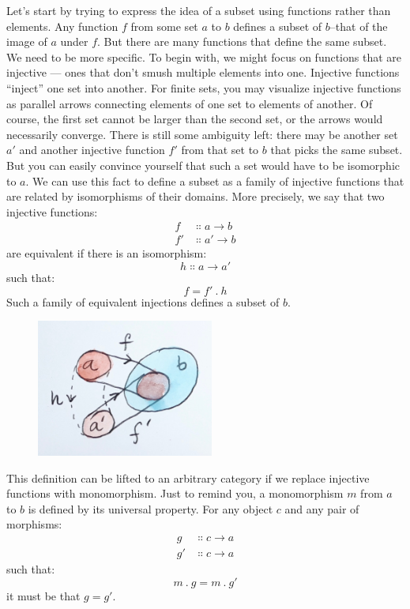 Let's start by trying to express the idea of a subset using functions
rather than elements. Any function $f$ from some set $a$
to $b$ defines a subset of $b$--that of the image of
$a$ under $f$. But there are many functions that define
the same subset. We need to be more specific. To begin with, we might
focus on functions that are injective --- ones that don't smush multiple
elements into one. Injective functions ``inject'' one set into another.
For finite sets, you may visualize injective functions as parallel
arrows connecting elements of one set to elements of another. Of course,
the first set cannot be larger than the second set, or the arrows would
necessarily converge. There is still some ambiguity left: there may be
another set $a'$ and another injective function
$f'$ from that set to $b$ that picks the same
subset. But you can easily convince yourself that such a set would have
to be isomorphic to $a$. We can use this fact to define a subset
as a family of injective functions that are related by isomorphisms of
their domains. More precisely, we say that two injective functions:
\begin{align*}
f &\Colon a \to b \\
f' &\Colon a' \to b
\end{align*}
are equivalent if there is an isomorphism:
\[h \Colon a \to a'\]
such that:
\[f = f'\ .\ h\]
Such a family of equivalent injections defines a subset of $b$.

\begin{figure}[H]
\centering
\includegraphics[width=2.29167in]{images/subsetinjection.jpg}
\end{figure}

\noindent
This definition can be lifted to an arbitrary category if we replace
injective functions with monomorphism. Just to remind you, a
monomorphism $m$ from $a$ to $b$ is defined by its
universal property. For any object $c$ and any pair of morphisms:
\begin{align*}
g &\Colon c \to a \\
g' &\Colon c \to a
\end{align*}
such that:
\[m\ .\ g = m\ .\ g'\]
it must be that $g = g'$.

